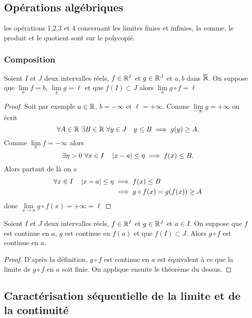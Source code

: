 \subsection{Opérations algébriques}

les opérations 1,2,3 et 4 concernant les limites finies et infinies, la somme, le produit et le quotient sont sur le polycopié.

\subsubsection{Composition}
\begin{theo}
  Soient $I$ et $J$ deux intervalles réels, $f \in \mathbb{R}^I$ et $g \in \mathbb{R}^J$ et $a,b$ dans $\overline{\mathbb{R}}$. On suppose que $\lim\limits_{a}f=b$, $\lim\limits_{b}g=\ell$ et que $f(I) \subset J$ alors $\lim\limits_{a} g \circ f=\ell$
\end{theo}
\begin{proof}
  Soit par exemple $a \in \mathbb{R}$, $b=-\infty$ et $\ell=+\infty$. Comme $\lim\limits_{-\infty}g=+\infty$ on écrit
  \begin{equation}
    \forall A \in \mathbb{R} \ \exists B \in \mathbb{R} \ \forall y \in J \quad y \leq B \implies g(y) \geq A.
  \end{equation}
  Comme $\lim\limits_{a}f=-\infty$ alors
  \begin{equation}
    \exists \eta > 0 \ \forall x \in I \quad \left\lvert x-a\right\rvert \leq \eta \implies f(x) \leq B.
  \end{equation}
  Alors partant de là on a
\begin{align}
  \forall x \in I \quad \left\lvert x-a\right\rvert \leq \eta &\implies f(x) \leq B\\
  &\implies g \circ f(x)=g(f(x)) \geq A
\end{align}
donc $\lim\limits_{x \to a} g \circ f(x)=+\infty=\ell$
\end{proof}
\begin{cor}
  Soient $I$ et $J$ deux intervalles réels, $f \in \mathbb{R}^I$ et $g \in \mathbb{R}^J$ et $a \in I$. On suppose que $f$ est continue en $a$, $g$ est continue en $f(a)$ et que $f(I) \subset J$. Alors $g \circ f$ est continue en $a$.
\end{cor}
\begin{proof}
  D'après la définition, $g \circ f$ est continue en $a$ est équivalent à ce que la limite de $g \circ f$ en $a$ soit finie. On applique ensuite le théorème du dessus.
\end{proof}

\subsection[Caractérisation séquentielle]{Caractérisation séquentielle de la limite et de la continuité}

